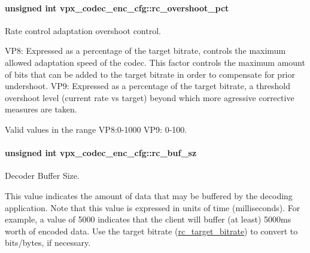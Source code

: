 \paragraph[{\texorpdfstring{rc\+\_\+overshoot\+\_\+pct}{rc_overshoot_pct}}]{\setlength{\rightskip}{0pt plus 5cm}unsigned int vpx\+\_\+codec\+\_\+enc\+\_\+cfg\+::rc\+\_\+overshoot\+\_\+pct}\hypertarget{structvpx__codec__enc__cfg_a4f2fbd015c1b1f395cc4a4b03d4ead5f}{}\label{structvpx__codec__enc__cfg_a4f2fbd015c1b1f395cc4a4b03d4ead5f}


Rate control adaptation overshoot control. 

V\+P8\+: Expressed as a percentage of the target bitrate, controls the maximum allowed adaptation speed of the codec. This factor controls the maximum amount of bits that can be added to the target bitrate in order to compensate for prior undershoot. V\+P9\+: Expressed as a percentage of the target bitrate, a threshold overshoot level (current rate vs target) beyond which more agressive corrective measures are taken.

Valid values in the range V\+P8\+:0-\/1000 V\+P9\+: 0-\/100. 
\paragraph[{\texorpdfstring{rc\+\_\+buf\+\_\+sz}{rc_buf_sz}}]{\setlength{\rightskip}{0pt plus 5cm}unsigned int vpx\+\_\+codec\+\_\+enc\+\_\+cfg\+::rc\+\_\+buf\+\_\+sz}\hypertarget{structvpx__codec__enc__cfg_a61866272bb588cd86d28834f420430f0}{}\label{structvpx__codec__enc__cfg_a61866272bb588cd86d28834f420430f0}


Decoder Buffer Size. 

This value indicates the amount of data that may be buffered by the decoding application. Note that this value is expressed in units of time (milliseconds). For example, a value of 5000 indicates that the client will buffer (at least) 5000ms worth of encoded data. Use the target bitrate (\hyperlink{structvpx__codec__enc__cfg_ab8339685175d66710f482706cc9f0aed}{rc\+\_\+target\+\_\+bitrate}) to convert to bits/bytes, if necessary. 

